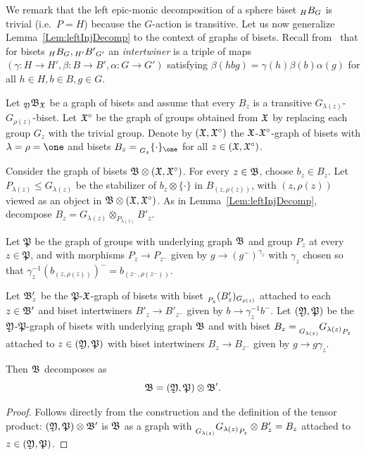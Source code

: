 \documentclass{amsart}
\begin{document}
\noindent We remark that the left epic-monic decomposition of a sphere
biset $\subscript{H}B_G$ is trivial (i.e.~$P=H$) because the
$G$-action is transitive. Let us now generalize
Lemma~\ref{Lem:leftInjDecomp} to the context of graphs of
bisets. Recall from~\cite{bartholdi-dudko:bc1} that for bisets
$\subscript H B_G,\subscript{H'}{B'}_{G'}$ an \emph{intertwiner} is a
triple of maps
$(\gamma\colon H\to H',\beta\colon B\to B',\alpha\colon G\to G')$
satisfying $\beta(h b g)=\gamma(h)\beta(b)\alpha(g)$ for all
$h\in H,b\in B,g\in G$.
\begin{prop}\label{Lem:GrBisleftInjDecomp}
  Let $\subscript\gfY\gfB_\gf$ be a graph of bisets and
  assume that every $B_z$ is a transitive
  $G_{\lambda(z)}$-$G_{\rho(z)}$-biset.  Let ${\mathfrak X}^\circ$ be the graph
  of groups obtained from ${\mathfrak X}$ by replacing each group $G_z$ with the
  trivial group. Denote by $({\mathfrak X},{\mathfrak X}^\circ)$ the
  ${\mathfrak X}$-${\mathfrak X}^\circ$-graph of bisets with $\lambda =\rho =\one$ and
  bisets $B_z=\subscript{G_{z}}\{\cdot\}_{\one}$ for all
  $z\in ({\mathfrak X},{\mathfrak X}^\circ)$.

  Consider the graph of bisets ${\mathfrak B} \otimes
  ({\mathfrak X},{\mathfrak X}^\circ)$. For every $z\in{\mathfrak B}$, choose $b_z\in B_z$.
  Let $P_{\lambda(z)}\le G_{\lambda(z)}$ be the stabilizer of $b_z
  \otimes \{\cdot\}$ in $B_{(z,\rho(z))}$, with $(z,\rho(z))$ viewed
  as an object in ${\mathfrak B}\otimes ({\mathfrak X},{\mathfrak X}^\circ)$. As in
  Lemma~\ref{Lem:leftInjDecomp}, decompose $B_z=
  G_{\lambda(z)}\otimes_{P_{\lambda(z)}} B'_z$.
 
  Let $\mathfrak P$ be the graph of groups with underlying graph
  ${\mathfrak B}$ and group $P_z$ at every $z\in \mathfrak P$, and with
  morphisms $P_{z}\to P_{z^-}$ given by $g\to (g^-)^{\gamma_z}$ with
  $\gamma_z$ chosen so that
  $\gamma^{-1}_z (b_{(z,\rho(z))})^{-}=b_{(z^-,\rho(z^-))}$.

  Let ${\mathfrak B}'_z$ be the $\mathfrak P$-${\mathfrak X}$-graph of bisets with biset
  $\subscript{P_{z}}(B'_z)_{G_{\rho(z)}}$ attached to each $z\in {\mathfrak B}'$
  and biset intertwiners $B'_z\to B'_{z^-}$ given by $b\to
  \gamma_z^{-1}b^{-}$. Let $({\mathfrak Y},\mathfrak P)$ be the
  ${\mathfrak Y}$-$\mathfrak P$-graph of bisets with underlying graph ${\mathfrak B}$
  and with biset $B_z=\subscript{G_{\lambda(z)}} {G_{\lambda(z)}}
  _{P_z}$ attached to $z\in ({\mathfrak Y},\mathfrak P)$ with biset intertwiners
  $B_z\to B_{z^-}$ given by $g\to g\gamma_z$.
   
  Then ${\mathfrak B}$ decomposes as
  \begin{equation}\label{eq:Lem:GrBisleftInjDecomp}
    {\mathfrak B}= ({\mathfrak Y},\mathfrak P) \otimes {\mathfrak B}'.
  \end{equation}
\end{prop}
\begin{proof}
  Follows directly from the construction and the definition of the
  tensor product: $({\mathfrak Y},\mathfrak P) \otimes {\mathfrak B}'$ is
  ${\mathfrak B}$ as a graph with
  $\subscript{G_{\lambda(z)}} {G_{\lambda(z)}}_{{P_z}}\otimes B'_z= B_z$
  attached to $z\in ({\mathfrak Y},\mathfrak P)$.
\end{proof}
\end{document}
